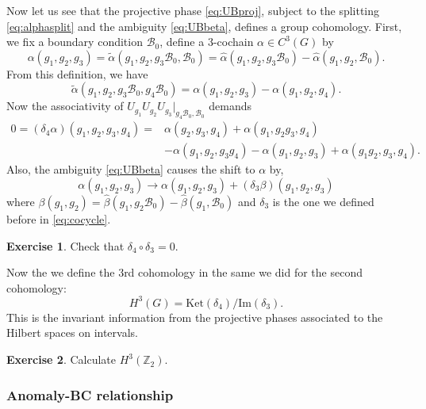 \documentclass[
]{scrartcl}
\numberwithin{equation}{section}
\renewenvironment{align}{\begin{equation}\begin{aligned}}{\end{aligned}\end{equation}}
\theoremstyle{definition}
\theoremstyle{definition}
\theoremstyle{definition}
\newtheorem{exercise}{Exercise}[section]
\theoremstyle{definition}
\theoremstyle{remark}
\begin{document}
Now let us see that the projective phase \eqref{eq:UBproj}, subject to the splitting \eqref{eq:alphasplit} and the ambiguity \eqref{eq:UBbeta}, defines a group cohomology.
First, we fix a boundary condition \(\mathcal{B}_0\), define a 3-cochain \(\alpha \in C^3(G)\) by
\begin{equation}
    \label{eq:alphadef}
    \alpha(g_1,g_2,g_3) = \tilde{\alpha}(g_1,g_2,g_3\mathcal{B}_0,\mathcal{B}_0) = \hat\alpha(g_1,g_2,g_3\mathcal{B}_0) - \hat\alpha(g_1,g_2,\mathcal{B}_0).
\end{equation}
From this definition, we have
\begin{equation}
    \label{eq:alphatildealpha}
    \tilde{\alpha}(g_1,g_2,g_3\mathcal{B}_0,g_4\mathcal{B}_0) =     
    \alpha(g_1,g_2,g_3) - \alpha(g_1,g_2,g_4).
\end{equation}
Now the associativity of \(U_{g_1}U_{g_2}U_{g_3}|_{g_4\mathcal{B}_0,\mathcal{B}_0}\) demands
\begin{align}
    \label{eq:3cocycle}
    0 = (\delta_4 \alpha) (g_1,g_2,g_3,g_4) = &\alpha(g_2,g_3,g_4) + \alpha (g_1,g_2g_3,g_4) \\&- \alpha(g_1,g_2,g_3g_4) - \alpha(g_1,g_2,g_3) + \alpha(g_1g_2,g_3,g_4).
\end{align}
Also, the ambiguity \eqref{eq:UBbeta} causes the shift to \(\alpha\) by,
\begin{equation}
    \label{eq:3coboundary}
    \alpha(g_1,g_2,g_3 )\to \alpha(g_1,g_2,g_3) + (\delta_3 \beta)(g_1,g_2,g_3)
\end{equation}
where \(\beta(g_1,g_2) = \hat\beta(g_1,g_2\mathcal{B}_0) - \hat\beta(g_1,\mathcal{B}_0)\) and \(\delta_3\) is the one we defined before in \eqref{eq:cocycle}.

\begin{exercise}
Check that \(\delta_4\circ \delta_3 = 0\).
\end{exercise}

Now the we define the 3rd cohomology in the same we did for the second cohomology:
\begin{equation}
    \label{eq:H3g}
    H^3(G) = \mathrm{Ket}(\delta_4)/\mathrm{Im}(\delta_3).
\end{equation}
This is the invariant information from the projective phases associated to the Hilbert spaces on intervals.

\begin{exercise}
Calculate \(H^3(\mathbb{Z}_2)\).
\end{exercise}

\hypertarget{anomaly-bc-relationship}{%
\subsubsection{Anomaly-BC relationship}\label{anomaly-bc-relationship}}
\end{document}
